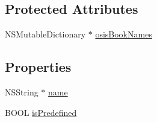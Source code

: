 \subsection*{Protected Attributes}
\begin{DoxyCompactItemize}
\item 
N\-S\-Mutable\-Dictionary $\ast$ \hyperlink{interface_search_book_set_a0c8f91395667336825fcaa94c4dd1140}{osis\-Book\-Names}
\end{DoxyCompactItemize}
\subsection*{Properties}
\begin{DoxyCompactItemize}
\item 
N\-S\-String $\ast$ \hyperlink{interface_search_book_set_afc8ccc6676addc3b49a494b2bf969c68}{name}
\item 
B\-O\-O\-L \hyperlink{interface_search_book_set_acb3f0b5da5aa8d9216cd913347d2452c}{is\-Predefined}
\end{DoxyCompactItemize}


